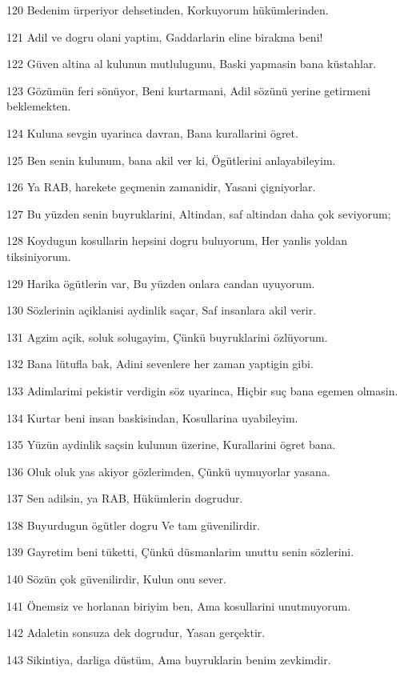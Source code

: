 \par 120 Bedenim ürperiyor dehsetinden, Korkuyorum hükümlerinden.
\par 121 Adil ve dogru olani yaptim, Gaddarlarin eline birakma beni!
\par 122 Güven altina al kulunun mutlulugunu, Baski yapmasin bana küstahlar.
\par 123 Gözümün feri sönüyor, Beni kurtarmani, Adil sözünü yerine getirmeni beklemekten.
\par 124 Kuluna sevgin uyarinca davran, Bana kurallarini ögret.
\par 125 Ben senin kulunum, bana akil ver ki, Ögütlerini anlayabileyim.
\par 126 Ya RAB, harekete geçmenin zamanidir, Yasani çigniyorlar.
\par 127 Bu yüzden senin buyruklarini, Altindan, saf altindan daha çok seviyorum;
\par 128 Koydugun kosullarin hepsini dogru buluyorum, Her yanlis yoldan tiksiniyorum.
\par 129 Harika ögütlerin var, Bu yüzden onlara candan uyuyorum.
\par 130 Sözlerinin açiklanisi aydinlik saçar, Saf insanlara akil verir.
\par 131 Agzim açik, soluk solugayim, Çünkü buyruklarini özlüyorum.
\par 132 Bana lütufla bak, Adini sevenlere her zaman yaptigin gibi.
\par 133 Adimlarimi pekistir verdigin söz uyarinca, Hiçbir suç bana egemen olmasin.
\par 134 Kurtar beni insan baskisindan, Kosullarina uyabileyim.
\par 135 Yüzün aydinlik saçsin kulunun üzerine, Kurallarini ögret bana.
\par 136 Oluk oluk yas akiyor gözlerimden, Çünkü uymuyorlar yasana.
\par 137 Sen adilsin, ya RAB, Hükümlerin dogrudur.
\par 138 Buyurdugun ögütler dogru Ve tam güvenilirdir.
\par 139 Gayretim beni tüketti, Çünkü düsmanlarim unuttu senin sözlerini.
\par 140 Sözün çok güvenilirdir, Kulun onu sever.
\par 141 Önemsiz ve horlanan biriyim ben, Ama kosullarini unutmuyorum.
\par 142 Adaletin sonsuza dek dogrudur, Yasan gerçektir.
\par 143 Sikintiya, darliga düstüm, Ama buyruklarin benim zevkimdir.
